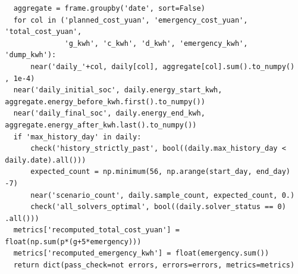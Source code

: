 \begin{verbatim}
    aggregate = frame.groupby('date', sort=False)
    for col in ('planned_cost_yuan', 'emergency_cost_yuan',
  'total_cost_yuan',
                'g_kwh', 'c_kwh', 'd_kwh', 'emergency_kwh',
  'dump_kwh'):
        near('daily_'+col, daily[col], aggregate[col].sum().to_numpy()
  , 1e-4)
    near('daily_initial_soc', daily.energy_start_kwh,
  aggregate.energy_before_kwh.first().to_numpy())
    near('daily_final_soc', daily.energy_end_kwh,
  aggregate.energy_after_kwh.last().to_numpy())
    if 'max_history_day' in daily:
        check('history_strictly_past', bool((daily.max_history_day <
  daily.date).all()))
        expected_count = np.minimum(56, np.arange(start_day, end_day)
  -7)
        near('scenario_count', daily.sample_count, expected_count, 0.)
        check('all_solvers_optimal', bool((daily.solver_status == 0)
  .all()))
    metrics['recomputed_total_cost_yuan'] =
  float(np.sum(p*(g+5*emergency)))
    metrics['recomputed_emergency_kwh'] = float(emergency.sum())
    return dict(pass_check=not errors, errors=errors, metrics=metrics)



\end{verbatim}
